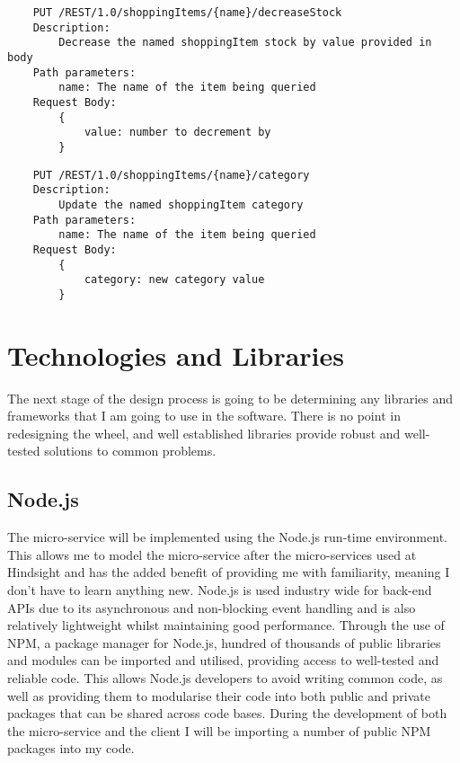 \begin{verbatim}
    PUT /REST/1.0/shoppingItems/{name}/decreaseStock
    Description:
        Decrease the named shoppingItem stock by value provided in body
    Path parameters:
        name: The name of the item being queried
    Request Body:
        {
            value: number to decrement by
        }
\end{verbatim}


\begin{verbatim}
    PUT /REST/1.0/shoppingItems/{name}/category
    Description:
        Update the named shoppingItem category
    Path parameters:
        name: The name of the item being queried
    Request Body:
        {
            category: new category value
        }
\end{verbatim}





\section{Technologies and Libraries}

The next stage of the design process is going to be determining any libraries and frameworks that I am going to use in the software. There is no point in redesigning the wheel, and well established libraries provide robust and well-tested solutions to common problems.

\subsection{Node.js}
The micro-service will be implemented using the Node.js run-time environment. This allows me to model the micro-service after the micro-services used at Hindsight and has the added benefit of providing me with familiarity, meaning I don't have to learn anything new. Node.js is used industry wide for back-end APIs due to its asynchronous and non-blocking event handling and is also relatively lightweight whilst maintaining good performance. Through the use of NPM, a package manager for Node.js, hundred of thousands of public libraries and modules can be imported and utilised, providing access to well-tested and reliable code. This allows Node.js developers to avoid writing common code, as well as providing them to modularise their code into both public and private packages that can be shared across code bases. During the development of both the micro-service and the client I will be importing a number of public NPM packages into my code.


